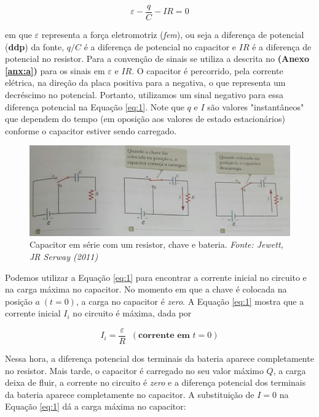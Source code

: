 \documentclass[a4paper,12pt]{article}
\begin{document}
\begin{equation} \label{eq:1}
\varepsilon - \frac{q}{C}-IR=0    
\end{equation}


em que $\varepsilon$ representa a força eletromotriz (\textit{fem}), ou seja a diferença de potencial (\textbf{ddp}) da fonte, $q/C$ é a diferença de potencial no capacitor e $IR$ é a diferença de potencial no resistor. Para a convenção de sinais se utiliza a descrita no \textbf{(Anexo \ref{anx:a})} para os sinais em $\varepsilon$ e $IR$. O capacitor é percorrido, pela corrente elétrica, na direção da placa positiva para a negativa, o que representa um decréscimo no potencial. Portanto, utilizamos um sinal negativo para essa diferença potencial na Equação \ref{eq:1}. Note que $q$ e $I$ são valores "instantâneos" que dependem do tempo (em oposição aos valores de estado estacionários) conforme o capacitor estiver sendo carregado. 

\begin{figure}[htp]
\centering
\includegraphics[width=14.5cm]{fig1}
\caption{Capacitor em série com um resistor, chave e bateria. \textit{Fonte: Jewett, JR Serway (2011)\cite{jeewett11}}}
\label{fig:1}
\end{figure}

Podemos utilizar a Equação \ref{eq:1} para encontrar a corrente inicial no circuito e na carga máxima no capacitor. No momento em que a chave é colocada na posição $a\;(t=0)$, a carga no capacitor é \textit{zero}. A Equação \ref{eq:1} mostra que a corrente inicial $I_i$ no circuito é máxima, dada por

\begin{equation} \label{eq:2}
I_i = \frac{\varepsilon}{R} \; \;(\textbf{corrente em } t=0)
\end{equation}

Nessa hora, a diferença potencial dos terminais da bateria aparece completamente no resistor. Mais tarde, o capacitor é carregado no seu valor máximo $Q$, a carga deixa de fluir, a corrente no circuito é \textit{zero} e a diferença potencial dos terminais da bateria aparece completamente no capacitor. A substituição de $I=0$ na Equação \ref{eq:1} dá a carga máxima no capacitor:
\end{document}
